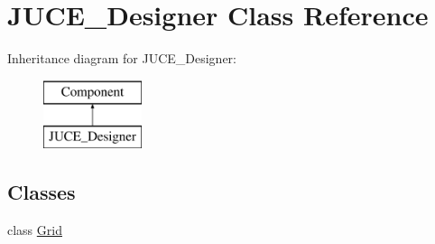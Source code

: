 \hypertarget{class_j_u_c_e___designer}{\section{J\-U\-C\-E\-\_\-\-Designer Class Reference}
\label{class_j_u_c_e___designer}
}
Inheritance diagram for J\-U\-C\-E\-\_\-\-Designer\-:\begin{figure}[H]
\begin{center}
\leavevmode
\includegraphics[height=2.000000cm]{class_j_u_c_e___designer}
\end{center}
\end{figure}
\subsection*{Classes}
\begin{DoxyCompactItemize}
\item 
class \hyperlink{class_j_u_c_e___designer_1_1_grid}{Grid}
\end{DoxyCompactItemize}
